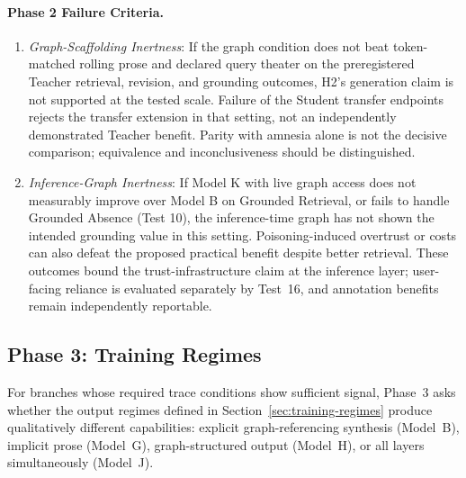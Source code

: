 \paragraph{Phase 2 Failure Criteria.}
\begin{enumerate}
    \item \emph{Graph-Scaffolding Inertness}: If the graph condition does not
    beat token-matched rolling prose and declared query theater on the
    preregistered Teacher retrieval, revision, and grounding outcomes, H2's
    generation claim is not supported at the tested scale. Failure of the
    Student transfer endpoints rejects the transfer extension in that setting,
    not an independently demonstrated Teacher benefit. Parity with amnesia
    alone is not the decisive comparison; equivalence and inconclusiveness
    should be distinguished.
    \item \emph{Inference-Graph Inertness}: If Model K with live graph access does not measurably improve over Model B on Grounded Retrieval, or fails to handle Grounded Absence (Test 10), the inference-time graph has not shown the intended grounding value in this setting. Poisoning-induced overtrust or costs can also defeat the proposed practical benefit despite better retrieval. These outcomes bound the trust-infrastructure claim at the inference layer; user-facing reliance is evaluated separately by Test~16, and annotation benefits remain independently reportable.
\end{enumerate}


\subsection{Phase 3: Training Regimes}

For branches whose required trace conditions show sufficient signal, Phase~3
asks whether the output regimes defined in
Section~\ref{sec:training-regimes} produce qualitatively different
capabilities: explicit graph-referencing synthesis (Model~B), implicit prose
(Model~G), graph-structured output (Model~H), or all layers simultaneously
(Model~J).


